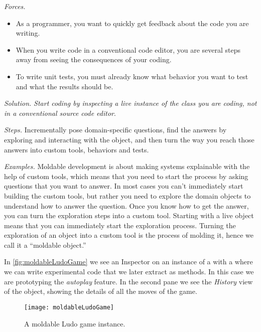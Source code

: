 \documentclass[acmsmall,screen,authorversion,nonacm]{acmart} %
\newcommand\cp[1]{\nbe{Cesare}{#1}{olive}} %
\newcommand\ws[1]{\nbe{Workshop}{#1}{teal}} %
\newcommand{\patref}[1]{\emph{\nameref{pat:#1}}\xspace}
\newcommand{\patsec}[1]{\noindent\textit{#1.}\xspace}
\begin{document}
\patsec{Forces}
\begin{itemize}[---]
\item As a programmer, you want to quickly get feedback about the code you are writing.
\item When you write code in a conventional code editor, you are several steps away from seeing the consequences of your coding.
\item To write unit tests, you must already know what behavior you want to test and what the results should be.
\end{itemize}

\patsec{Solution}
\emph{Start coding by inspecting a live instance of the class you are coding, not in a conventional source code editor}.

\patsec{Steps}
Incrementally pose domain-specific questions, find the answers by exploring and interacting with the object, and then turn the way you reach those answers into custom tools, behaviors and tests.

\patsec{Examples}
Moldable development is about making systems explainable with the help of custom tools, which means that you need to start the process by asking questions that you want to answer.
In most cases you can't immediately start building the custom tools, but rather you need to explore the domain objects to understand how to answer the question.
Once you know how to get the answer, you can turn the exploration steps into a custom tool.
Starting with a live object means that you can immediately start the exploration process.
Turning the exploration of an object into a custom tool is the process of molding it, hence we call it a ``moldable object.''

In \autoref{fig:moldableLudoGame} we see an Inspector on an instance of a  with a \patref{ContextualPlayground} where we can write experimental code that we later extract as methods.
In this case we are prototyping the \emph{autoplay} feature.
In the second pane we see the \emph{History} view of the object, showing the details of all the moves of the game.


\begin{figure}[h]
  \texttt{[image: moldableLudoGame]}
  \caption{A moldable Ludo game instance.}
  \label{fig:moldableLudoGame}
\end{figure}
\end{document}
